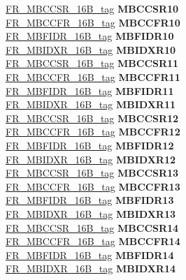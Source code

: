 \begin{DoxyCompactItemize}
\begin{tabbing}
\>\>\mbox{\hyperlink{unionFR__MBCCSR__16B__tag}{FR\_MBCCSR\_16B\_tag}} {\bfseries MBCCSR10}\\
\>\>\mbox{\hyperlink{unionFR__MBCCFR__16B__tag}{FR\_MBCCFR\_16B\_tag}} {\bfseries MBCCFR10}\\
\>\>\mbox{\hyperlink{unionFR__MBFIDR__16B__tag}{FR\_MBFIDR\_16B\_tag}} {\bfseries MBFIDR10}\\
\>\>\mbox{\hyperlink{unionFR__MBIDXR__16B__tag}{FR\_MBIDXR\_16B\_tag}} {\bfseries MBIDXR10}\\
\>\>\mbox{\hyperlink{unionFR__MBCCSR__16B__tag}{FR\_MBCCSR\_16B\_tag}} {\bfseries MBCCSR11}\\
\>\>\mbox{\hyperlink{unionFR__MBCCFR__16B__tag}{FR\_MBCCFR\_16B\_tag}} {\bfseries MBCCFR11}\\
\>\>\mbox{\hyperlink{unionFR__MBFIDR__16B__tag}{FR\_MBFIDR\_16B\_tag}} {\bfseries MBFIDR11}\\
\>\>\mbox{\hyperlink{unionFR__MBIDXR__16B__tag}{FR\_MBIDXR\_16B\_tag}} {\bfseries MBIDXR11}\\
\>\>\mbox{\hyperlink{unionFR__MBCCSR__16B__tag}{FR\_MBCCSR\_16B\_tag}} {\bfseries MBCCSR12}\\
\>\>\mbox{\hyperlink{unionFR__MBCCFR__16B__tag}{FR\_MBCCFR\_16B\_tag}} {\bfseries MBCCFR12}\\
\>\>\mbox{\hyperlink{unionFR__MBFIDR__16B__tag}{FR\_MBFIDR\_16B\_tag}} {\bfseries MBFIDR12}\\
\>\>\mbox{\hyperlink{unionFR__MBIDXR__16B__tag}{FR\_MBIDXR\_16B\_tag}} {\bfseries MBIDXR12}\\
\>\>\mbox{\hyperlink{unionFR__MBCCSR__16B__tag}{FR\_MBCCSR\_16B\_tag}} {\bfseries MBCCSR13}\\
\>\>\mbox{\hyperlink{unionFR__MBCCFR__16B__tag}{FR\_MBCCFR\_16B\_tag}} {\bfseries MBCCFR13}\\
\>\>\mbox{\hyperlink{unionFR__MBFIDR__16B__tag}{FR\_MBFIDR\_16B\_tag}} {\bfseries MBFIDR13}\\
\>\>\mbox{\hyperlink{unionFR__MBIDXR__16B__tag}{FR\_MBIDXR\_16B\_tag}} {\bfseries MBIDXR13}\\
\>\>\mbox{\hyperlink{unionFR__MBCCSR__16B__tag}{FR\_MBCCSR\_16B\_tag}} {\bfseries MBCCSR14}\\
\>\>\mbox{\hyperlink{unionFR__MBCCFR__16B__tag}{FR\_MBCCFR\_16B\_tag}} {\bfseries MBCCFR14}\\
\>\>\mbox{\hyperlink{unionFR__MBFIDR__16B__tag}{FR\_MBFIDR\_16B\_tag}} {\bfseries MBFIDR14}\\
\>\>\mbox{\hyperlink{unionFR__MBIDXR__16B__tag}{FR\_MBIDXR\_16B\_tag}} {\bfseries MBIDXR14}\\

\end{tabbing}
\end{DoxyCompactItemize}

